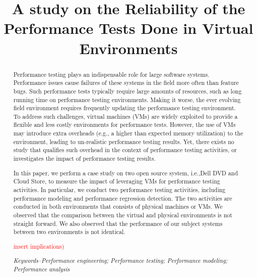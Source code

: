 \documentclass[conference]{IEEEtran}
\begin{document}
\title{A study on the Reliability of the Performance Tests Done in Virtual Environments}

\author{

}

\maketitle

	\begin{abstract}
		Performance testing plays an indispensable role for large software systems. Performance issues cause failures of these systems in the field more often than feature bugs. Such performance tests typically require large amounts of resources, such as long running time on performance testing environments. Making it worse, the ever evolving field environment requires frequently updating the performance testing environment. To address such challenges, virtual machines (VMs) are widely exploited to provide a flexible and less costly environments for performance tests. However, the use of VMs may introduce extra overheads (e.g., a higher than expected memory utilization) to the environment, leading to un-realistic performance testing results. Yet, there exists no study that qualifies such overhead in the context of performance testing activities, or investigates the impact of performance testing results. 
		
		In this paper, we perform a case study on two open source system, i.e.,Dell DVD and Cloud Store, to measure the impact of leveraging VMs for performance testing activities. In particular, we conduct two performance testing activities, including performance modeling and performance regression detection. The two activities are conducted in both environments that consists of physical machines or VMs. We observed that the comparison between the virtual and physical environments is not straight forward. We also observed that the performance of our subject systems between two environments is not identical.
		
		\textcolor{red}{insert implications)}
	
	\textit{Keywords--Performance engineering; Performance testing; Performance modeling; Performance analysis}	
	\end{abstract}
	
\end{document}
